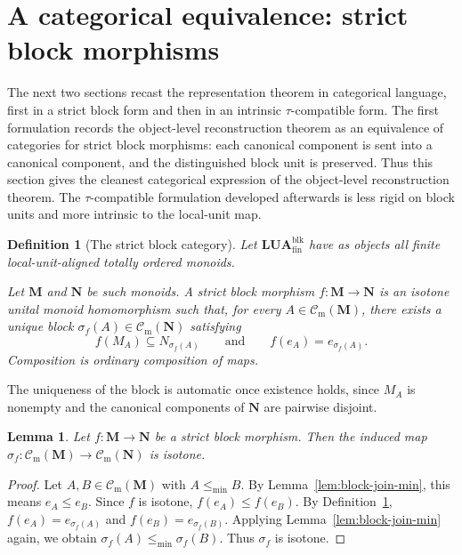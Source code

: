 \documentclass[pdflatex,sn-mathphys-num]{sn-jnl}
\theoremstyle{thmstyleone}%
\newtheorem{lemma}[theorem]{Lemma}
\theoremstyle{thmstyletwo}%
\theoremstyle{thmstylethree}%
\newtheorem{definition}[theorem]{Definition}
\newcommand{\Cm}{\mathcal C_{\mathrm m}}
\begin{document}
\section{A categorical equivalence: strict block morphisms}\label{sec:categorical-equivalence}

The next two sections recast the representation theorem in categorical language, first in a strict block form and then in an intrinsic \(\tau\)-compatible form.
The first formulation records the object-level reconstruction theorem as an equivalence of categories for strict block morphisms: each canonical component is sent into a canonical component, and the distinguished block unit is preserved.
Thus this section gives the cleanest categorical expression of the object-level reconstruction theorem.
The \(\tau\)-compatible formulation developed afterwards is less rigid on block units and more intrinsic to the local-unit map.

\begin{definition}[The strict block category]\label{def:cat-lua-blk-finite}
Let \(\mathbf{LUA}^{\mathrm{blk}}_{\mathrm{fin}}\) have as objects all finite local-unit-aligned totally ordered monoids.

Let \(\mathbf M\) and \(\mathbf N\) be such monoids.
A \emph{strict block morphism} \(f\colon \mathbf M\to \mathbf N\) is an isotone unital monoid homomorphism such that, for every \(A\in \Cm(\mathbf M)\), there exists a unique block \(\sigma_f(A)\in \Cm(\mathbf N)\) satisfying
\[
f(M_A)\subseteq N_{\sigma_f(A)}
\qquad\text{and}\qquad
f(e_A)=e_{\sigma_f(A)}.
\]
Composition is ordinary composition of maps.
\end{definition}

The uniqueness of the block is automatic once existence holds, since \(M_A\) is nonempty and the canonical components of \(\mathbf N\) are pairwise disjoint.

\begin{lemma}\label{lem:block-preserving-morphism-induces-sigma}
Let \(f\colon \mathbf M\to \mathbf N\) be a strict block morphism.
Then the induced map \(\sigma_f\colon \Cm(\mathbf M)\to \Cm(\mathbf N)\) is isotone.
\end{lemma}

\begin{proof}
Let \(A,B\in \Cm(\mathbf M)\) with \(A\le_{\min} B\).
By Lemma~\ref{lem:block-join-min}, this means \(e_A\le e_B\).
Since \(f\) is isotone, \(f(e_A)\le f(e_B)\).
By Definition~\ref{def:cat-lua-blk-finite}, \(f(e_A)=e_{\sigma_f(A)}\) and \(f(e_B)=e_{\sigma_f(B)}\).
Applying Lemma~\ref{lem:block-join-min} again, we obtain \(\sigma_f(A)\le_{\min}\sigma_f(B)\).
Thus \(\sigma_f\) is isotone.
\end{proof}
\end{document}
